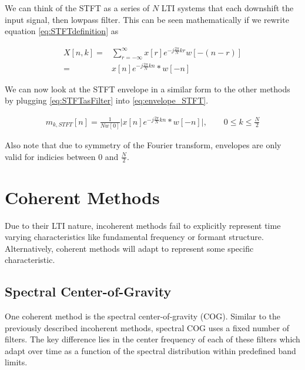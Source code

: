 \documentclass [11pt, proquest,oneside] {ganter_thesis}[2015/03/03]
\begin{document}
We can think of the STFT as a series of $N$ LTI systems that each downshift the input signal, then lowpass filter.  This can be seen mathematically if we rewrite equation \ref{eq:STFTdefinition} as

\begin{align}
X[n,k] =& \sum\limits_{r=-\infty}^{\infty} x[r] e^{-j\frac{2\pi}{N}kr} w[-(n - r)] \nonumber \\
=& x[n] e^{-j\frac{2\pi}{N}kn} * w[-n]
\end{align}

We can now look at the STFT envelope in a similar form to the other methods by plugging \ref{eq:STFTasFilter} into \ref{eq:envelope_STFT}.

\begin{align}
\label{eq:STFT_envelope}
m_{k,STFT}[n] =  \frac{1}{Nw[0]}  \Big\vert x[n] e^{-j\frac{2\pi}{N}kn} * w[-n] \Big\vert, \qquad 0 \leq k \leq \frac{N}{2}
\end{align}

Also note that due to symmetry of the Fourier transform, envelopes are only valid for indicies between $0$ and $\frac{N}{2}$.

\section{Coherent Methods}

Due to their LTI nature, incoherent methods fail to explicitly represent time varying characteristics like fundamental frequency or formant structure. \cite{wilson1993design}  Alternatively, coherent methods will adapt to represent some specific characteristic.



\subsection{Spectral Center-of-Gravity}

One coherent method is the spectral center-of-gravity (COG).  Similar to the previously described incoherent methods, spectral COG uses a fixed number of filters.  The key difference lies in the center frequency of each of these filters which adapt over time as a function of the spectral distribution within predefined band limits.
\end{document}
